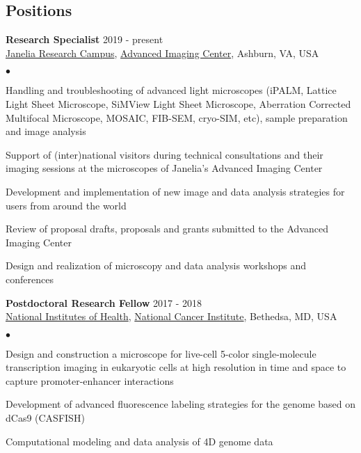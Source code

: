 \documentclass[margin,line]{res}
\newenvironment{list2}{
  \begin{list}{$\bullet$}{%
      \setlength{\itemsep}{0in}
      \setlength{\parsep}{0in} \setlength{\parskip}{0in}
      \setlength{\topsep}{0in} \setlength{\partopsep}{0in} 
      \setlength{\leftmargin}{0.2in}}}{\end{list}}
\begin{document}
\begin{resume}

\section{\sc Positions}
{\bf Research Specialist} \hfill {2019 - present}\\
\href{https://www.janelia.org/}{Janelia Research Campus}, \href{https://www.aicjanelia.org/}{Advanced Imaging Center}, Ashburn, VA, USA\\
 \vspace*{-2mm}
\begin{list2}
\vspace*{-1mm}
\item Handling and troubleshooting of  advanced light microscopes (iPALM, Lattice Light Sheet Microscope, SiMView Light Sheet Microscope, Aberration Corrected Multifocal Microscope, MOSAIC, FIB-SEM, cryo-SIM, etc), sample preparation and image analysis
\item Support of (inter)national visitors during technical consultations and their imaging sessions at the microscopes of  Janelia's Advanced Imaging Center
\item Development and implementation of  new image and data analysis strategies for users from around the world
\item Review of proposal drafts,  proposals and grants submitted to the Advanced Imaging Center
\item Design and realization of  microscopy and data analysis workshops and conferences
\end{list2}
{\bf Postdoctoral Research Fellow} \hfill {2017 - 2018}\\
\href{https://www.nih.gov/}{National Institutes of Health}, \href{https://www.cancer.gov/}{National Cancer Institute}, Bethedsa, MD, USA\\
\vspace*{-2mm}
\begin{list2}
\vspace*{-1mm}
\item Design and construction a microscope for live-cell 5-color single-molecule transcription imaging in eukaryotic cells at high resolution in time and space to capture promoter-enhancer interactions 
\item Development of advanced fluorescence labeling strategies for the genome based on dCas9 (CASFISH)
\item Computational modeling and data analysis of 4D genome data
\end{list2}

\end{resume}
\end{document}
